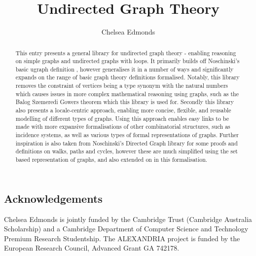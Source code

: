 \documentclass[11pt,a4paper]{article}
\begin{document}
\title{Undirected Graph Theory}
\author{Chelsea Edmonds}
\maketitle

\begin{abstract}
  This entry presents a general library for undirected graph theory - enabling reasoning on simple graphs and undirected graphs with loops. It primarily builds off Noschinski's basic ugraph definition \cite{noschinski_2012}, however generalises it in a number of ways and significantly expands on the range of basic graph theory definitions formalised. Notably, this library removes the constraint of vertices being a type synonym with the natural numbers which causes issues in more complex mathematical reasoning using graphs, such as the Balog Szemeredi Gowers theorem which this library is used for. Secondly this library also presents a locale-centric approach, enabling more concise, flexible, and reusable modelling of different types of graphs. Using this approach enables easy links to be made with more expansive formalisations of other combinatorial structures, such as incidence systems, as well as various types of formal representations of graphs. Further inspiration is also taken from Noschinski's \cite{noschinski_2015} Directed Graph library for some proofs and definitions on walks, paths and cycles, however these are much simplified using the set based representation of graphs, and also extended on in this formalisation.
\end{abstract}

\tableofcontents

\subsection*{Acknowledgements}
Chelsea Edmonds is jointly funded by the Cambridge Trust (Cambridge Australia Scholarship)
and a Cambridge Department of Computer Science and Technology Premium Research Studentship.
The ALEXANDRIA project is funded by the European Research Council, Advanced Grant GA 742178.
\newpage





\end{document}
